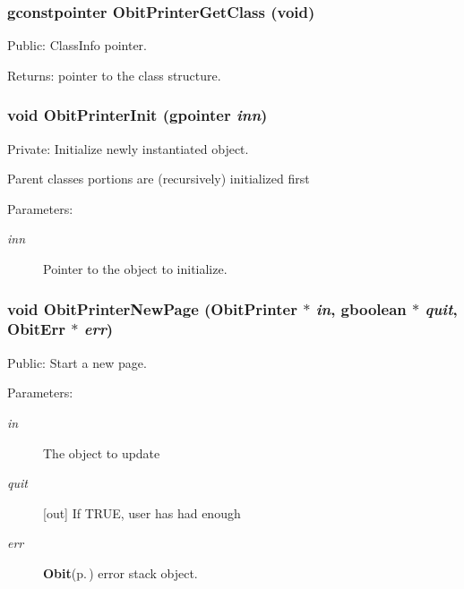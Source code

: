 \subsubsection{\setlength{\rightskip}{0pt plus 5cm}gconstpointer Obit\-Printer\-Get\-Class (void)}\label{ObitPrinter_8c_a7}


Public: Class\-Info pointer. 

\begin{Desc}
\item[Returns:]pointer to the class structure. \end{Desc}
\subsubsection{\setlength{\rightskip}{0pt plus 5cm}void Obit\-Printer\-Init (gpointer {\em inn})}\label{ObitPrinter_8c_a3}


Private: Initialize newly instantiated object. 

Parent classes portions are (recursively) initialized first \begin{Desc}
\item[Parameters:]
\begin{description}
\item[{\em inn}]Pointer to the object to initialize. \end{description}
\end{Desc}
\subsubsection{\setlength{\rightskip}{0pt plus 5cm}void Obit\-Printer\-New\-Page ({\bf Obit\-Printer} $\ast$ {\em in}, gboolean $\ast$ {\em quit}, {\bf Obit\-Err} $\ast$ {\em err})}\label{ObitPrinter_8c_a15}


Public: Start a new page. 

\begin{Desc}
\item[Parameters:]
\begin{description}
\item[{\em in}]The object to update \item[{\em quit}][out] If TRUE, user has had enough \item[{\em err}]{\bf Obit}{\rm (p.\,\pageref{structObit})} error stack object. \end{description}
\end{Desc}
